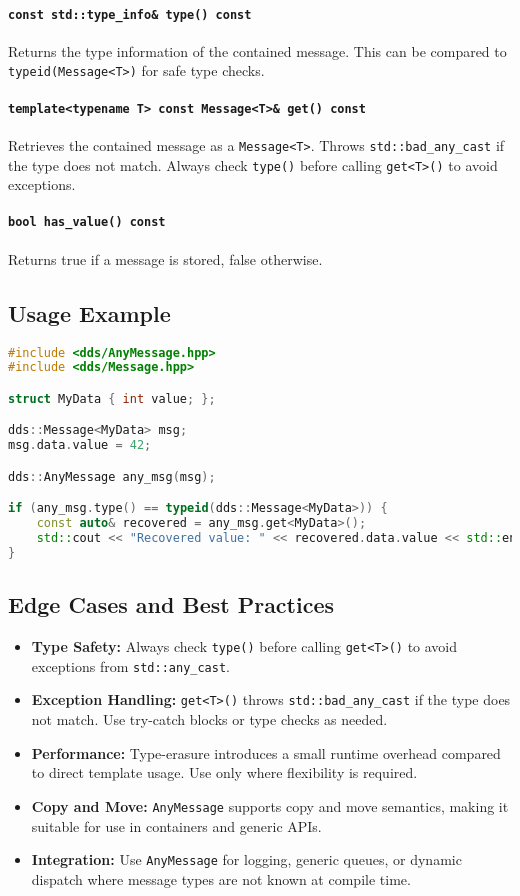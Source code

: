 \documentclass[12pt]{report}
\begin{document}
\paragraph{\texttt{const std::type\_info\& type() const}}
Returns the type information of the contained message. This can be compared to \texttt{typeid(Message<T>)} for safe type checks.

\paragraph{\texttt{template<typename T> const Message<T>\& get() const}}
Retrieves the contained message as a \texttt{Message<T>}. Throws \texttt{std::bad\_any\_cast} if the type does not match. Always check \texttt{type()} before calling \texttt{get<T>()} to avoid exceptions.

\paragraph{\texttt{bool has\_value() const}}
Returns true if a message is stored, false otherwise.

\subsection{Usage Example}
\begin{lstlisting}[language=C++]
#include <dds/AnyMessage.hpp>
#include <dds/Message.hpp>

struct MyData { int value; };

dds::Message<MyData> msg;
msg.data.value = 42;

dds::AnyMessage any_msg(msg);

if (any_msg.type() == typeid(dds::Message<MyData>)) {
    const auto& recovered = any_msg.get<MyData>();
    std::cout << "Recovered value: " << recovered.data.value << std::endl;
}
\end{lstlisting}

\subsection{Edge Cases and Best Practices}
\begin{itemize}
    \item \textbf{Type Safety:} Always check \texttt{type()} before calling \texttt{get<T>()} to avoid exceptions from \texttt{std::any\_cast}.
    \item \textbf{Exception Handling:} \texttt{get<T>()} throws \texttt{std::bad\_any\_cast} if the type does not match. Use try-catch blocks or type checks as needed.
    \item \textbf{Performance:} Type-erasure introduces a small runtime overhead compared to direct template usage. Use only where flexibility is required.
    \item \textbf{Copy and Move:} \texttt{AnyMessage} supports copy and move semantics, making it suitable for use in containers and generic APIs.
    \item \textbf{Integration:} Use \texttt{AnyMessage} for logging, generic queues, or dynamic dispatch where message types are not known at compile time.
\end{itemize}
\end{document}
